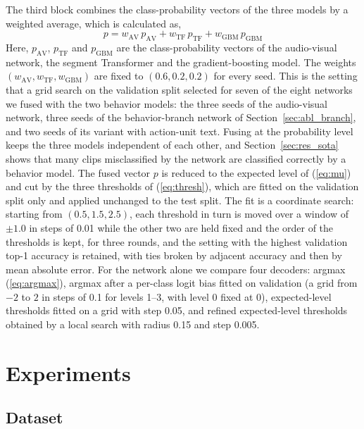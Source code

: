 \documentclass[pdflatex,iicol,sn-basic]{sn-jnl}
\begin{document}
The third block combines the class-probability vectors of the three models by a weighted average, which is calculated as,
\begin{equation}
p = w_{\mathrm{AV}}\, p_{\mathrm{AV}} + w_{\mathrm{TF}}\, p_{\mathrm{TF}} + w_{\mathrm{GBM}}\, p_{\mathrm{GBM}} \label{eq:late}
\end{equation}
Here, $p_{\mathrm{AV}}$, $p_{\mathrm{TF}}$ and $p_{\mathrm{GBM}}$ are the class-probability vectors of the audio-visual network, the segment Transformer and the gradient-boosting model. The weights $(w_{\mathrm{AV}}, w_{\mathrm{TF}}, w_{\mathrm{GBM}})$ are fixed to $(0.6, 0.2, 0.2)$ for every seed. This is the setting that a grid search on the validation split selected for seven of the eight networks we fused with the two behavior models: the three seeds of the audio-visual network, three seeds of the behavior-branch network of Section~\ref{sec:abl_branch}, and two seeds of its variant with action-unit text. Fusing at the probability level keeps the three models independent of each other, and Section~\ref{sec:res_sota} shows that many clips misclassified by the network are classified correctly by a behavior model. The fused vector $p$ is reduced to the expected level of (\ref{eq:mu}) and cut by the three thresholds of (\ref{eq:thresh}), which are fitted on the validation split only and applied unchanged to the test split. The fit is a coordinate search: starting from $(0.5, 1.5, 2.5)$, each threshold in turn is moved over a window of $\pm 1.0$ in steps of 0.01 while the other two are held fixed and the order of the thresholds is kept, for three rounds, and the setting with the highest validation top-1 accuracy is retained, with ties broken by adjacent accuracy and then by mean absolute error. For the network alone we compare four decoders: argmax (\ref{eq:argmax}), argmax after a per-class logit bias fitted on validation (a grid from $-2$ to $2$ in steps of 0.1 for levels 1--3, with level 0 fixed at 0), expected-level thresholds fitted on a grid with step 0.05, and refined expected-level thresholds obtained by a local search with radius 0.15 and step 0.005.

\section{Experiments}\label{sec:exp}

\subsection{Dataset}\label{sec:dataset}
\end{document}
